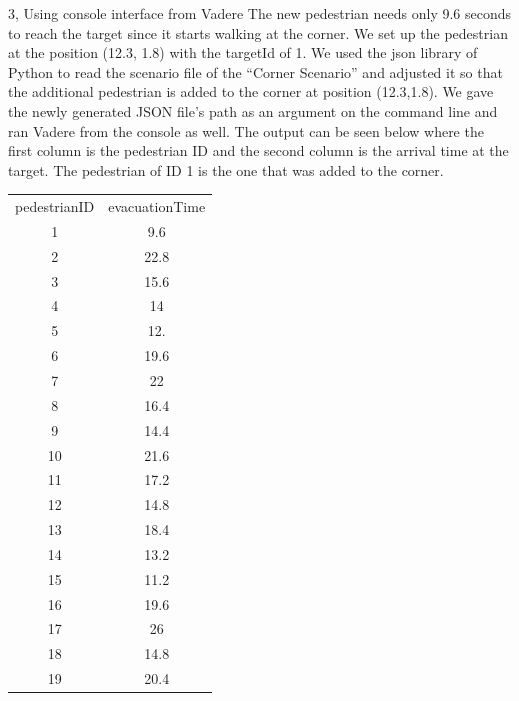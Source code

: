 \documentclass[10pt,a4paper]{article}
\begin{document}
\begin{task}{3, Using console interface from Vadere}
The new pedestrian needs only 9.6 seconds to reach the target since it starts walking at the corner. We set up the pedestrian at the position (12.3, 1.8) with the targetId of 1. We used the json library of Python to read the scenario file of the “Corner Scenario” and adjusted it so that the additional pedestrian is added to the corner at position (12.3,1.8). We gave the newly generated JSON file’s path as an argument on the command line and ran Vadere from the console as well. The output can be seen below where the first column is the pedestrian ID and the second column is the arrival time at the target. The pedestrian of ID 1 is the one that was added to the corner.\\
\bigbreak
    \begin{tabular}{c|c}
    pedestrianID&evacuationTime\\
        1&	9.6\\
        2&	22.8\\
        3&	15.6\\
        4&	14\\
        5&	12.\\
        6&	19.6\\
        7&	22\\
        8&	16.4\\
        9&	14.4\\
        10&	21.6\\
        11&	17.2\\
        12&	14.8\\
        13&	18.4\\
        14&	13.2\\
        15&	11.2\\
        16&	19.6\\
        17&	26\\
        18&	14.8\\
        19&	20.4\\
    \end{tabular}
    \bigbreak
\end{task}
\end{document}
